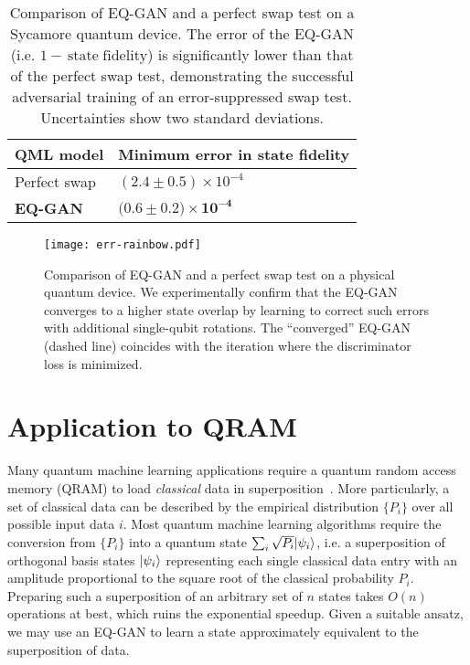 \documentclass[prl,superscriptaddress,twocolumn]{revtex4}
\makeatletter
\newcommand{\sket}[1]{{\ensuremath{\lvert#1\rangle}}}
\newcommand{\lket}[1]{{\ensuremath{\left\lvert#1\right\rangle}}}
\newcommand{\ket}[1]{\if@display\lket{#1}\else\sket{#1}\fi}
\theoremstyle{plain}
\theoremstyle{definition}
\makeatother
\begin{document}
\begin{table}[h!]
\centering
\begin{tabular}{ p{3cm}||p{4.5cm} }
 QML model & Minimum error in state fidelity\\
 \hline
 Perfect swap & $(2.4 \pm 0.5) \times 10^{-4}$ \\
 \textbf{EQ-GAN} & $(\mathbf{0.6 \pm 0.2) \times 10^{-4}}$
  \end{tabular} 
 \caption{Comparison of EQ-GAN and a perfect swap test on a Sycamore quantum device. The error of the EQ-GAN (i.e. $1 -\, \mathrm{state\; fidelity}$) is significantly lower than that of the perfect swap test, demonstrating the successful adversarial training of an error-suppressed swap test. Uncertainties show two standard deviations.}
 \label{tab:err}
\end{table}

\begin{figure}[h!]
\begin{center}
\texttt{[image: err-rainbow.pdf]}
\caption{Comparison of EQ-GAN and a perfect swap test on a physical quantum device. We experimentally confirm that the EQ-GAN converges to a higher state overlap by learning to correct such errors with additional single-qubit rotations. The ``converged'' EQ-GAN (dashed line) coincides with the iteration where the discriminator loss is minimized.}
\label{fig:err}
\end{center}
\end{figure}

\section{Application to QRAM}%
Many quantum machine learning applications require a quantum random access memory (QRAM) to load \emph{classical} data in superposition~\cite{lloyd2016}. More particularly, a set of classical data can be described by the empirical distribution $\{P_i\}$ over all possible input data $i$. Most quantum machine learning algorithms require the conversion from  $\{P_i\}$ into a quantum state $\sum_i \sqrt{P_i}\ket{\psi_i}$, i.e. a superposition of orthogonal basis states $\ket{\psi_i}$ representing each single classical data entry with an amplitude proportional to the square root of the classical probability $P_i$. Preparing such a superposition of an arbitrary set of $n$ states takes $O(n)$ operations at best, which ruins the exponential speedup. Given a suitable ansatz, we may use an EQ-GAN to learn a state approximately equivalent to the superposition of data.  
\end{document}
